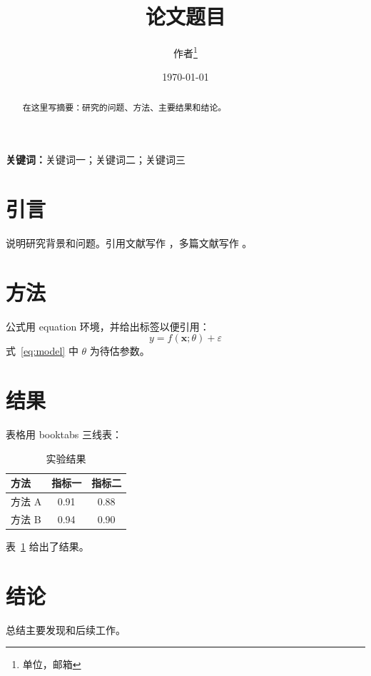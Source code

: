 \documentclass[UTF8,a4paper,12pt]{ctexart}
\title{论文题目}
\author{作者\thanks{单位，邮箱}}
\date{\today}
\begin{document}
\maketitle

\begin{abstract}
在这里写摘要：研究的问题、方法、主要结果和结论。
\end{abstract}

\noindent\textbf{关键词：}关键词一；关键词二；关键词三

\section{引言}

说明研究背景和问题。引用文献写作 \cite{lecun2015deep}，多篇文献写作 \cite{lecun2015deep,gbt7714-2015}。

\section{方法}

公式用 equation 环境，并给出标签以便引用：
\begin{equation}
  y = f(\mathbf{x}; \theta) + \varepsilon
  \label{eq:model}
\end{equation}
式~\eqref{eq:model} 中 $\theta$ 为待估参数。

\section{结果}

表格用 booktabs 三线表：
\begin{table}[H]
  \centering
  \caption{实验结果}
  \label{tab:results}
  \begin{tabular}{lcc}
    \toprule
    方法 & 指标一 & 指标二 \\
    \midrule
    方法 A & 0.91 & 0.88 \\
    方法 B & 0.94 & 0.90 \\
    \bottomrule
  \end{tabular}
\end{table}

表~\ref{tab:results} 给出了结果。

\section{结论}

总结主要发现和后续工作。


\end{document}
